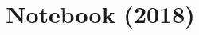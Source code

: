 \documentclass[pt]{extarticle}
\title{\vspace{-4ex}\Large{Notebook (2018)}}
\author{}
\date{}
\begin{document}
\begin{landscape}
\begin{multicols}{2}

\maketitle
\vspace{-13ex}
\tableofcontents
\pagestyle{fancy}



\end{multicols}
\end{landscape}
\end{document}
